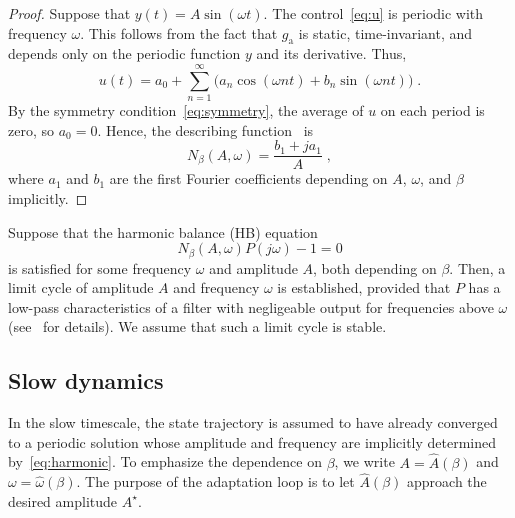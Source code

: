 \documentclass{article}
\newcommand{\ra}{\mathrm{a}}
\newcommand{\rd}{\mathrm{d}}
\theoremstyle{definition}
\theoremstyle{remark}
\begin{document}
\begin{proof}
    Suppose that $y(t) = A\sin(\omega t)$. The control~\eqref{eq:u} is periodic with frequency $\omega$. This follows from the fact that $g_\ra$ is static, time-invariant, and depends only on the periodic function $y$ and its derivative. Thus,
    \begin{displaymath}
        u(t) = a_0 + \sum_{n=1}^\infty \big(a_n\cos\left(\omega n t\right)+b_n\sin \left(\omega n t \right)\big) \;.
    \end{displaymath}
    By the symmetry condition~\eqref{eq:symmetry}, the average of $u$ on each period is zero, so $a_0 = 0$. Hence, the describing function~\cite[Eqs.~(2.2-16), (2.2-28)-(2.2-34)]{gelb} is
    \begin{displaymath}
        N_\beta(A,\omega) = \frac{b_1+ja_1}{A} \;,
    \end{displaymath}
    where $a_1$ and $b_1$ are the first Fourier coefficients depending on $A$, $\omega$, and $\beta$ implicitly.
\end{proof}

Suppose that the harmonic balance (HB) equation
\begin{equation} \label{eq:harmonic}
    N_\beta(A,\omega)P(j\omega) - 1 = 0 
\end{equation}
is satisfied for some frequency $\omega$ and amplitude $A$, both depending on $\beta$. Then, a limit cycle of amplitude $A$ and frequency $\omega$ is established, provided that $P$ has a low-pass characteristics of a filter with negligeable output for frequencies above $\omega$ (see~\cite{gelb} for details). We assume that such a limit cycle is stable.

\subsection{Slow dynamics}

In the slow timescale, the state trajectory is assumed to have already converged to a periodic solution whose amplitude and frequency are implicitly determined by~\eqref{eq:harmonic}. To emphasize the dependence on $\beta$, we write $A = \hat{A}(\beta)$ and $\omega = \hat{\omega}(\beta)$. The purpose of the adaptation loop is to let $\hat{A}(\beta)$ approach the desired amplitude $A^\star$.
\end{document}
